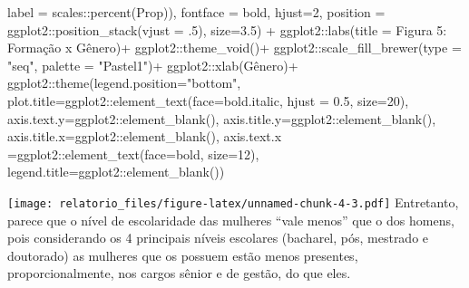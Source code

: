 \documentclass[
]{article}
\newenvironment{Shaded}{\begin{snugshade}}{\end{snugshade}}
\newcommand{\AttributeTok}[1]{\textcolor[rgb]{0.77,0.63,0.00}{#1}}
\newcommand{\DecValTok}[1]{\textcolor[rgb]{0.00,0.00,0.81}{#1}}
\newcommand{\FloatTok}[1]{\textcolor[rgb]{0.00,0.00,0.81}{#1}}
\newcommand{\FunctionTok}[1]{\textcolor[rgb]{0.00,0.00,0.00}{#1}}
\newcommand{\NormalTok}[1]{#1}
\newcommand{\SpecialCharTok}[1]{\textcolor[rgb]{0.00,0.00,0.00}{#1}}
\newcommand{\StringTok}[1]{\textcolor[rgb]{0.31,0.60,0.02}{#1}}
\begin{document}
\begin{Shaded}
\begin{Highlighting}[]
    \AttributeTok{label =}\NormalTok{ scales}\SpecialCharTok{::}\FunctionTok{percent}\NormalTok{(Prop)),}
    \AttributeTok{fontface =} \StringTok{\textquotesingle{}bold\textquotesingle{}}\NormalTok{,}
    \AttributeTok{hjust=}\DecValTok{2}\NormalTok{,}
    \AttributeTok{position =}\NormalTok{ ggplot2}\SpecialCharTok{::}\FunctionTok{position\_stack}\NormalTok{(}\AttributeTok{vjust =}\NormalTok{ .}\DecValTok{5}\NormalTok{),}
    \AttributeTok{size=}\FloatTok{3.5}\NormalTok{) }\SpecialCharTok{+}
\NormalTok{  ggplot2}\SpecialCharTok{::}\FunctionTok{labs}\NormalTok{(}\AttributeTok{title =} \StringTok{\textquotesingle{}Figura 5: Formação x Gênero\textquotesingle{}}\NormalTok{)}\SpecialCharTok{+}
\NormalTok{  ggplot2}\SpecialCharTok{::}\FunctionTok{theme\_void}\NormalTok{()}\SpecialCharTok{+}
\NormalTok{  ggplot2}\SpecialCharTok{::}\FunctionTok{scale\_fill\_brewer}\NormalTok{(}\AttributeTok{type =} \StringTok{"seq"}\NormalTok{, }\AttributeTok{palette =} \StringTok{"Pastel1"}\NormalTok{)}\SpecialCharTok{+}
\NormalTok{  ggplot2}\SpecialCharTok{::}\FunctionTok{xlab}\NormalTok{(}\StringTok{\textquotesingle{}Gênero\textquotesingle{}}\NormalTok{)}\SpecialCharTok{+}
\NormalTok{  ggplot2}\SpecialCharTok{::}\FunctionTok{theme}\NormalTok{(}\AttributeTok{legend.position=}\StringTok{"bottom"}\NormalTok{,}
                 \AttributeTok{plot.title=}\NormalTok{ggplot2}\SpecialCharTok{::}\FunctionTok{element\_text}\NormalTok{(}\AttributeTok{face=}\StringTok{\textquotesingle{}bold.italic\textquotesingle{}}\NormalTok{,}
                                                  \AttributeTok{hjust =} \FloatTok{0.5}\NormalTok{, }\AttributeTok{size=}\DecValTok{20}\NormalTok{),}
                 \AttributeTok{axis.text.y=}\NormalTok{ggplot2}\SpecialCharTok{::}\FunctionTok{element\_blank}\NormalTok{(),}
                 \AttributeTok{axis.title.y=}\NormalTok{ggplot2}\SpecialCharTok{::}\FunctionTok{element\_blank}\NormalTok{(),}
                 \AttributeTok{axis.title.x=}\NormalTok{ggplot2}\SpecialCharTok{::}\FunctionTok{element\_blank}\NormalTok{(),}
                 \AttributeTok{axis.text.x =}\NormalTok{ggplot2}\SpecialCharTok{::}\FunctionTok{element\_text}\NormalTok{(}\AttributeTok{face=}\StringTok{\textquotesingle{}bold\textquotesingle{}}\NormalTok{, }\AttributeTok{size=}\DecValTok{12}\NormalTok{),}
                 \AttributeTok{legend.title=}\NormalTok{ggplot2}\SpecialCharTok{::}\FunctionTok{element\_blank}\NormalTok{())}
\end{Highlighting}
\end{Shaded}

\texttt{[image: relatorio\_files/figure-latex/unnamed-chunk-4-3.pdf]}
Entretanto, parece que o nível de escolaridade das mulheres ``vale
menos'' que o dos homens, pois considerando os 4 principais níveis
escolares (bacharel, pós, mestrado e doutorado) as mulheres que os
possuem estão menos presentes, proporcionalmente, nos cargos sênior e de
gestão, do que eles.
\end{document}
